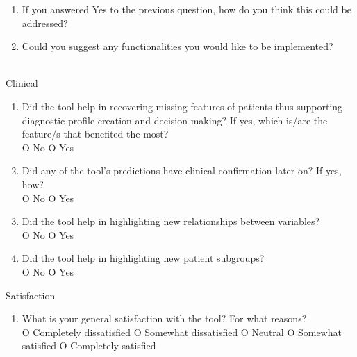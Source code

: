 \begin{mdframed}
\begin{enumerate}[resume]
		\item If you answered Yes to the previous question, how do you think this could be addressed?
		\item Could you suggest any functionalities you would like to be implemented?\\\\
	\end{enumerate}
	{\Large Clinical}
	\begin{enumerate}[resume]
		\item Did the tool help in recovering missing features of patients thus supporting diagnostic profile creation and decision making? If yes, which is/are the feature/s that benefited the most? \\
		O No O Yes
		\item Did any of the tool's predictions have clinical confirmation later on?  If yes, how? \\
		O No O Yes
		\item Did the tool help in highlighting new relationships between variables? \\
		O No O Yes
		\item Did the tool help in highlighting new patient subgroups? \\
		O No O Yes
	\end{enumerate}
	{\Large Satisfaction}
	\begin{enumerate}[resume]
		\item What is your general satisfaction with the tool? For what reasons? \\
		O Completely dissatisfied O Somewhat dissatisfied O Neutral O Somewhat satisfied O Completely satisfied
	\end{enumerate}
\end{mdframed}